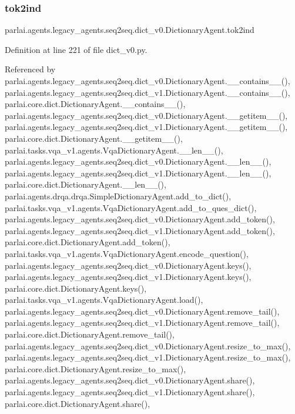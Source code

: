 \subsubsection{\texorpdfstring{tok2ind}{tok2ind}}
{\footnotesize\ttfamily parlai.\+agents.\+legacy\+\_\+agents.\+seq2seq.\+dict\+\_\+v0.\+Dictionary\+Agent.\+tok2ind}



Definition at line 221 of file dict\+\_\+v0.\+py.



Referenced by parlai.\+agents.\+legacy\+\_\+agents.\+seq2seq.\+dict\+\_\+v0.\+Dictionary\+Agent.\+\_\+\+\_\+contains\+\_\+\+\_\+(), parlai.\+agents.\+legacy\+\_\+agents.\+seq2seq.\+dict\+\_\+v1.\+Dictionary\+Agent.\+\_\+\+\_\+contains\+\_\+\+\_\+(), parlai.\+core.\+dict.\+Dictionary\+Agent.\+\_\+\+\_\+contains\+\_\+\+\_\+(), parlai.\+agents.\+legacy\+\_\+agents.\+seq2seq.\+dict\+\_\+v0.\+Dictionary\+Agent.\+\_\+\+\_\+getitem\+\_\+\+\_\+(), parlai.\+agents.\+legacy\+\_\+agents.\+seq2seq.\+dict\+\_\+v1.\+Dictionary\+Agent.\+\_\+\+\_\+getitem\+\_\+\+\_\+(), parlai.\+core.\+dict.\+Dictionary\+Agent.\+\_\+\+\_\+getitem\+\_\+\+\_\+(), parlai.\+tasks.\+vqa\+\_\+v1.\+agents.\+Vqa\+Dictionary\+Agent.\+\_\+\+\_\+len\+\_\+\+\_\+(), parlai.\+agents.\+legacy\+\_\+agents.\+seq2seq.\+dict\+\_\+v0.\+Dictionary\+Agent.\+\_\+\+\_\+len\+\_\+\+\_\+(), parlai.\+agents.\+legacy\+\_\+agents.\+seq2seq.\+dict\+\_\+v1.\+Dictionary\+Agent.\+\_\+\+\_\+len\+\_\+\+\_\+(), parlai.\+core.\+dict.\+Dictionary\+Agent.\+\_\+\+\_\+len\+\_\+\+\_\+(), parlai.\+agents.\+drqa.\+drqa.\+Simple\+Dictionary\+Agent.\+add\+\_\+to\+\_\+dict(), parlai.\+tasks.\+vqa\+\_\+v1.\+agents.\+Vqa\+Dictionary\+Agent.\+add\+\_\+to\+\_\+ques\+\_\+dict(), parlai.\+agents.\+legacy\+\_\+agents.\+seq2seq.\+dict\+\_\+v0.\+Dictionary\+Agent.\+add\+\_\+token(), parlai.\+agents.\+legacy\+\_\+agents.\+seq2seq.\+dict\+\_\+v1.\+Dictionary\+Agent.\+add\+\_\+token(), parlai.\+core.\+dict.\+Dictionary\+Agent.\+add\+\_\+token(), parlai.\+tasks.\+vqa\+\_\+v1.\+agents.\+Vqa\+Dictionary\+Agent.\+encode\+\_\+question(), parlai.\+agents.\+legacy\+\_\+agents.\+seq2seq.\+dict\+\_\+v0.\+Dictionary\+Agent.\+keys(), parlai.\+agents.\+legacy\+\_\+agents.\+seq2seq.\+dict\+\_\+v1.\+Dictionary\+Agent.\+keys(), parlai.\+core.\+dict.\+Dictionary\+Agent.\+keys(), parlai.\+tasks.\+vqa\+\_\+v1.\+agents.\+Vqa\+Dictionary\+Agent.\+load(), parlai.\+agents.\+legacy\+\_\+agents.\+seq2seq.\+dict\+\_\+v0.\+Dictionary\+Agent.\+remove\+\_\+tail(), parlai.\+agents.\+legacy\+\_\+agents.\+seq2seq.\+dict\+\_\+v1.\+Dictionary\+Agent.\+remove\+\_\+tail(), parlai.\+core.\+dict.\+Dictionary\+Agent.\+remove\+\_\+tail(), parlai.\+agents.\+legacy\+\_\+agents.\+seq2seq.\+dict\+\_\+v0.\+Dictionary\+Agent.\+resize\+\_\+to\+\_\+max(), parlai.\+agents.\+legacy\+\_\+agents.\+seq2seq.\+dict\+\_\+v1.\+Dictionary\+Agent.\+resize\+\_\+to\+\_\+max(), parlai.\+core.\+dict.\+Dictionary\+Agent.\+resize\+\_\+to\+\_\+max(), parlai.\+agents.\+legacy\+\_\+agents.\+seq2seq.\+dict\+\_\+v0.\+Dictionary\+Agent.\+share(), parlai.\+agents.\+legacy\+\_\+agents.\+seq2seq.\+dict\+\_\+v1.\+Dictionary\+Agent.\+share(), parlai.\+core.\+dict.\+Dictionary\+Agent.\+share(), 